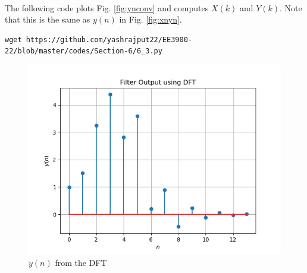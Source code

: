 \documentclass[journal,12pt,twocolumn]{IEEEtran}
\renewcommand\thesection{\arabic{section}}
\begin{document}
\begin{enumerate}[label=\thesection.\arabic*]
\\
\solution The following code plots Fig. \ref{fig:ynconv} and computes $X(k)$
and $Y(k)$. Note that this is the same as 
$y(n)$ in  Fig. 
\ref{fig:xnyn}. 
%
\begin{lstlisting}
wget https://github.com/yashrajput22/EE3900-22/blob/master/codes/Section-6/6_3.py
\end{lstlisting}
\begin{figure}[!ht]
\centering
\includegraphics[width=\columnwidth]{./figs/6_3}
\caption{$y(n)$ from the DFT}
\label{fig:yndft}
\end{figure}


\end{enumerate}
\end{document}
